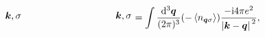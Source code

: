 \begin{equation}
\begin{gathered}
\begin{tikzpicture}[x=0.75pt,y=0.75pt,yscale=-1,xscale=1]
            \draw (272,240) node [anchor=east] [inner sep=0.75pt]    {$\boldsymbol{k} , \sigma $};
            \draw (400.44,239.78) node [anchor=west] [inner sep=0.75pt]    {$\boldsymbol{k} , \sigma$};
            \end{tikzpicture}            
    \end{gathered} = \int \frac{\dd[3]{\vb*{q}}}{(2\pi)^3} (- \expval{n_{\vb*{q} \sigma}}) \frac{- \ii 4 \pi e^2}{\abs*{\vb*{k} - \vb*{q}}^2} ,
\end{equation}